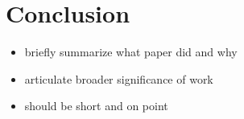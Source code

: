 \section{Conclusion}

\begin{itemize}
  \item briefly summarize what paper did and why
  \item articulate broader significance of work
  \item should be short and on point
\end{itemize}